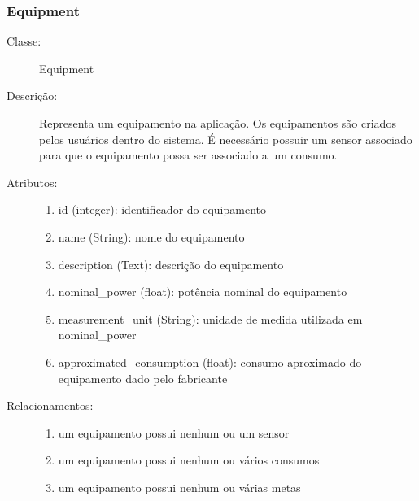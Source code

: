 \subsubsection{Equipment}
\begin{description}
  \item[Classe:] Equipment
  \item[Descrição:] Representa um equipamento na aplicação. Os equipamentos são criados pelos usuários dentro do sistema. É necessário possuir um sensor associado para que o equipamento possa ser associado a um consumo.
  \item[Atributos:] \hfill
    \begin{enumerate}
      \item id (integer): identificador do equipamento
      \item name (String): nome do equipamento
      \item description (Text): descrição do equipamento 
      \item nominal\_power (float): potência nominal do equipamento 
      \item measurement\_unit (String): unidade de medida utilizada em nominal\_power
      \item approximated\_consumption (float): consumo aproximado do equipamento dado pelo fabricante 
    \end{enumerate}
  \item[Relacionamentos:] \hfill
    \begin{enumerate}
      \item um equipamento possui nenhum ou um sensor
      \item um equipamento possui nenhum ou vários consumos
      \item um equipamento possui nenhum ou várias metas
    \end{enumerate}
\end{description} 
%
